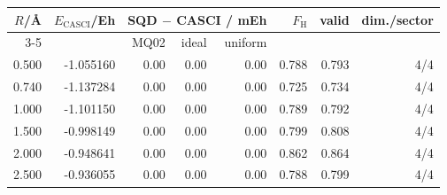 \begin{tabular}{rrrrrrrr}
\toprule
$R$/\AA & $E_\mathrm{CASCI}$/Eh & \multicolumn{3}{c}{SQD $-$ CASCI / mEh} & $F_\mathrm{H}$ & valid & dim./sector \\
\cmidrule(lr){3-5}
 & & MQ02 & ideal & uniform & & & \\
\midrule
0.500 & -1.055160 & 0.00 & 0.00 & 0.00 & 0.788 & 0.793 & 4/4 \\
0.740 & -1.137284 & 0.00 & 0.00 & 0.00 & 0.725 & 0.734 & 4/4 \\
1.000 & -1.101150 & 0.00 & 0.00 & 0.00 & 0.789 & 0.792 & 4/4 \\
1.500 & -0.998149 & 0.00 & 0.00 & 0.00 & 0.799 & 0.808 & 4/4 \\
2.000 & -0.948641 & 0.00 & 0.00 & 0.00 & 0.862 & 0.864 & 4/4 \\
2.500 & -0.936055 & 0.00 & 0.00 & 0.00 & 0.788 & 0.799 & 4/4 \\
\bottomrule
\end{tabular}
